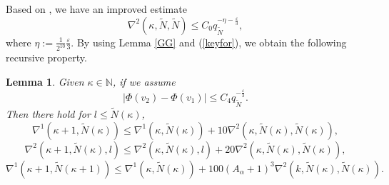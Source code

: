 \documentclass{amsart}
\newtheorem{Lemma}[Definition]{Lemma}
\theoremstyle{definition}
\begin{document}
Based on \cite[Corollary 3.1]{KO1}, we have an improved estimate
\begin{equation}\label{keyfor}
\nabla^2(\kappa,\tilde{N},\tilde{N})\leq C_0q_{\tilde{N}}^{-\eta-\frac{\varepsilon}{3}},
\end{equation}
where $\eta:=\frac{1}{2^{10}}\frac{\varepsilon}{3}$. By using Lemma \ref{GG} and (\ref{keyfor}), we obtain the following recursive property.
\begin{Lemma}\label{SSH}
{Given $\kappa \in \mathbb{N}$, if we assume
	\[|\Phi(v_2)-\Phi(v_1)|\leq C_4 q_{\tilde{N}}^{-\frac{\varepsilon}{3}}.\]
	Then there hold for $l \leq \tilde{N}(\kappa)$,
	\begin{equation}\label{X4}
	\nabla^{1}(\kappa+1,\tilde{N}(\kappa))\leq\nabla^{1}(\kappa,\tilde{N}(\kappa))+10\nabla^{2}(\kappa,\tilde{N}(\kappa),\tilde{N}(\kappa)),
	\end{equation}
	\begin{equation}\label{X1}
	\nabla^{2}(\kappa+1,\tilde{N}(\kappa),l)\leq\nabla^{2}(\kappa,\tilde{N}(\kappa),l)+20\nabla^{2}(\kappa,\tilde{N}(\kappa),\tilde{N}(\kappa)),
	\end{equation}
	\begin{equation}\label{X2}
	\nabla^{1}(\kappa+1,\tilde{N}(\kappa+1))\leq\nabla^{1}(\kappa,\tilde{N}(\kappa))+100(A_{\alpha}+1)^3\nabla^{2}(k,\tilde{N}(\kappa),\tilde{N}(\kappa)).
	\end{equation}}

\end{Lemma}
\end{document}
